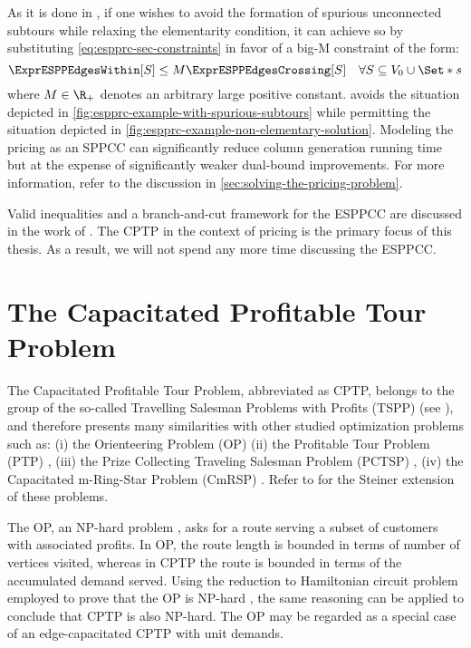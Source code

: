 As it is done in \textcite{beasley1989},
if one wishes to avoid the formation of spurious unconnected subtours
while relaxing the elementarity condition,
it can achieve so by substituting \cref{eq:espprc-sec-constraints} in favor
of a big-M constraint of the form:
\begin{equation}
	\label{eq:espprc-relaxed-elementarity}
	\ExprESPPEdgesWithin[S] \le M \ExprESPPEdgesCrossing[S] \quad \forall S \subseteq V_0 \cup \Set*{s}
\end{equation}
where $M \in \R_+$ denotes an arbitrary large positive constant.
 avoids the situation depicted
in \cref{fig:espprc-example-with-spurious-subtours}
while permitting the situation depicted in \cref{fig:espprc-example-non-elementary-solution}.
Modeling the pricing as an SPPCC can significantly reduce column generation running time
but at the expense of significantly weaker dual-bound improvements.
For more information, refer to the discussion in \cref{sec:solving-the-pricing-problem}.

Valid inequalities and a branch-and-cut framework for the ESPPCC
are discussed in the work of \textcite{jepsen2008branchandcut}.
The CPTP in the context of pricing is the primary focus of this thesis.
As a result, we will not spend any more time discussing the ESPPCC.

\section{The Capacitated Profitable Tour Problem}
\label{sec:the-capacitated-profitable-tour-problem}

The Capacitated Profitable Tour Problem, abbreviated as CPTP,
belongs to the group of the so-called
Travelling Salesman Problems with Profits (TSPP) (see \cite{feillet2005}),
and therefore presents many similarities with other
studied optimization problems such as:
(i) the Orienteering Problem (OP) \parencite{golden1987, laporte1990}
(ii) the Profitable Tour Problem (PTP) \parencite{dellamico1995},
(iii) the Prize Collecting Traveling Salesman Problem (PCTSP) \parencite{balas1989prize, balas1995prize},
(iv) the Capacitated m-Ring-Star Problem (CmRSP) \parencite{baldacci2007capacitated}.
Refer to \textcite{letchford2013} for the Steiner extension of these problems.

The OP, an NP-hard problem \parencite{laporte1990}, asks for a route serving
a subset of customers with associated profits.
In OP, the route length is bounded in terms of number of vertices visited,
whereas in CPTP the route is bounded in terms of the accumulated demand served.
Using the reduction to Hamiltonian circuit problem
employed to prove that the OP is NP-hard \parencite{laporte1990},
the same reasoning can be applied to conclude that CPTP is also NP-hard.
The OP may be regarded as a special case of an edge-capacitated CPTP with unit demands.

